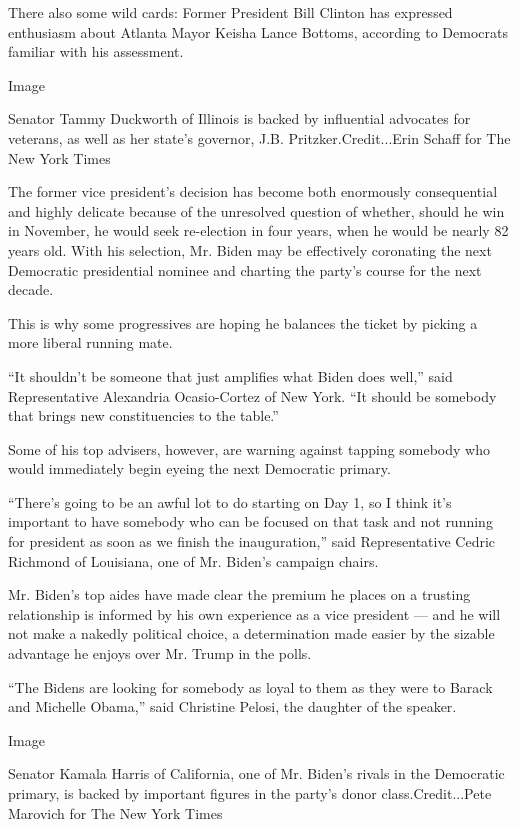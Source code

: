 There also some wild cards: Former President Bill Clinton has expressed
enthusiasm about Atlanta Mayor Keisha Lance Bottoms, according to
Democrats familiar with his assessment.

Image

Senator Tammy Duckworth of Illinois is backed by influential advocates
for veterans, as well as her state's governor, J.B.
Pritzker.Credit...Erin Schaff for The New York Times

The former vice president's decision has become both enormously
consequential and highly delicate because of the unresolved question of
whether, should he win in November, he would seek re-election in four
years, when he would be nearly 82 years old. With his selection, Mr.
Biden may be effectively coronating the next Democratic presidential
nominee and charting the party's course for the next decade.

This is why some progressives are hoping he balances the ticket by
picking a more liberal running mate.

``It shouldn't be someone that just amplifies what Biden does well,''
said Representative Alexandria Ocasio-Cortez of New York. ``It should be
somebody that brings new constituencies to the table.''

Some of his top advisers, however, are warning against tapping somebody
who would immediately begin eyeing the next Democratic primary.

``There's going to be an awful lot to do starting on Day 1, so I think
it's important to have somebody who can be focused on that task and not
running for president as soon as we finish the inauguration,'' said
Representative Cedric Richmond of Louisiana, one of Mr. Biden's campaign
chairs.

Mr. Biden's top aides have made clear the premium he places on a
trusting relationship is informed by his own experience as a vice
president --- and he will not make a nakedly political choice, a
determination made easier by the sizable advantage he enjoys over Mr.
Trump in the polls.

``The Bidens are looking for somebody as loyal to them as they were to
Barack and Michelle Obama,'' said Christine Pelosi, the daughter of the
speaker.

Image

Senator Kamala Harris of California, one of Mr. Biden's rivals in the
Democratic primary, is backed by important figures in the party's donor
class.Credit...Pete Marovich for The New York Times

